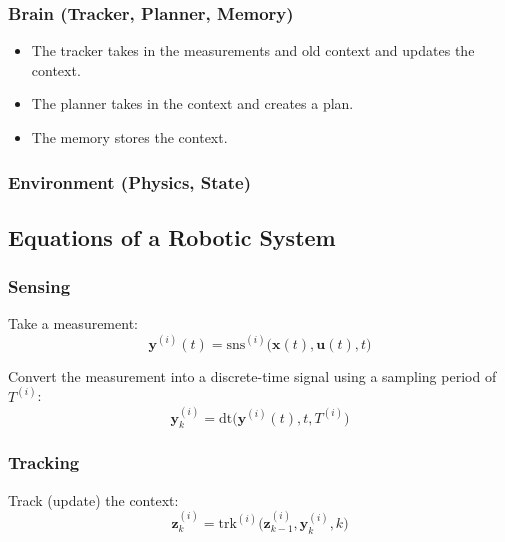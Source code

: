 \subsubsection{Brain (Tracker, Planner, Memory)}
\begin{definition}
\end{definition}

\begin{notes}
    \begin{itemize}
        \item The tracker takes in the measurements and old context and updates the context.
        \item The planner takes in the context and creates a plan.
        \item The memory stores the context.
    \end{itemize}
\end{notes}

\subsubsection{Environment (Physics, State)}
\begin{definition}
\end{definition}
\newpage

\subsection{Equations of a Robotic System}

\subsubsection{Sensing}
\begin{definition}
    Take a measurement:
    \[
    \mathbf{y}^{(i)}(t) = \text{sns}^{(i)}\big(\mathbf{x}(t), \mathbf{u}(t), t\big)
    \]

    Convert the measurement into a discrete-time signal using a sampling period of \( T^{(i)} \):
    \[
    \mathbf{y}_k^{(i)} = \text{dt}\big(\mathbf{y}^{(i)}(t), t, T^{(i)}\big)
    \]
\end{definition}

\subsubsection{Tracking}
\begin{definition}
    Track (update) the context:
    \[
    \mathbf{z}_k^{(i)} = \text{trk}^{(i)}\big(\mathbf{z}_{k-1}^{(i)}, \mathbf{y}_k^{(i)}, k\big)
    \]
\end{definition}
\newpage


